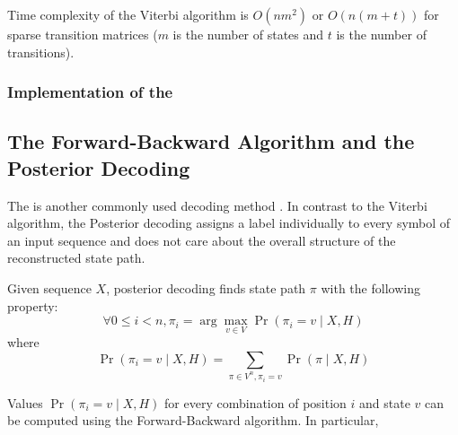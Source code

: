 Time complexity of the Viterbi algorithm is $O(nm^2)$ or $O(n(m+t))$ for sparse
transition matrices ($m$ is the number of states and $t$ is the number of
transitions).

\subsubsection{Implementation of the }

\subsection{The Forward-Backward Algorithm and  the Posterior Decoding}

The  is another commonly used decoding method
\cite{Kall2005, Durbin1998}. In contrast to the Viterbi algorithm, the
Posterior decoding assigns a label individually to every symbol of an input
sequence and does not care about the overall structure of the reconstructed
state path. 

Given sequence $X$, posterior decoding finds state path $\pi$ with the following
property:
\[\forall 0\leq i< n, \pi_i=\arg\max_{v\in V}\Pr\left(\pi_i=v\mid X,H\right) \]
where \[\Pr\left(\pi_i=v\mid X,H\right) = \sum_{\pi\in V^n,\pi_i=v}\Pr\left(\pi\mid X,H\right)\]

Values $\Pr\left(\pi_i=v\mid X,H\right)$ for every
combination of position $i$ and state $v$ can be computed using the Forward-Backward
algorithm. In particular,

